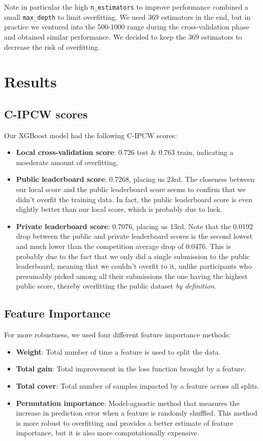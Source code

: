 \documentclass{article}
\begin{document}
Note in particular the high \texttt{n\_estimators} to improve performance combined a small \texttt{max\_depth} to limit overfitting. We used 369 estimators in the end, but in practice we ventured into the 500-1000 range during the cross-validation phase and obtained similar performance. We decided to keep the 369 estimators to decrease the risk of overfitting.

\section{Results}
\subsection{C-IPCW scores}
Our XGBoost model had the following C-IPCW scores:
\begin{itemize}
    \item \textbf{Local cross-validation score}: 0.726 test \& 0.763 train, indicating a moederate amount of overfitting.
    \item  \textbf{Public leaderboard score}: 0.7268, placing us 23rd. The closeness between our local score and the public leaderboard score seems to confirm that we didn't overfit the training data. In fact, the public leaderboard score is even slightly better than our local score, which is probably due to luck.
    \item \textbf{Private leaderboard score}: 0.7076, placing us 13rd. Note that the 0.0192 drop between the public and private leaderboard scores is the second lowest and much lower than the competition average drop of 0.0476. This is probably due to the fact that we only did a single submission to the public leaderboard, meaning that we couldn't overfit to it, unlike participants who presumably picked among all their submissions the one having the highest public score, thereby overfitting the public dataset \textit{by definition}.
\end{itemize}

\subsection{Feature Importance}
For more robustness, we used four different feature importance methods:
\begin{itemize}
    \item \textbf{Weight}: Total number of time a feature is used to split the data.
    \item \textbf{Total gain}: Total improvement in the loss function brought by a feature.
    \item \textbf{Total cover}: Total number of samples impacted by a feature across all splits.
    \item \textbf{Permutation importance}: Model-agnostic method that measures the increase in prediction error when a feature is randomly shuffled. This method is more robust to overfitting and provides a better estimate of feature importance, but it is also more computationally expensive.
\end{itemize}
\end{document}
